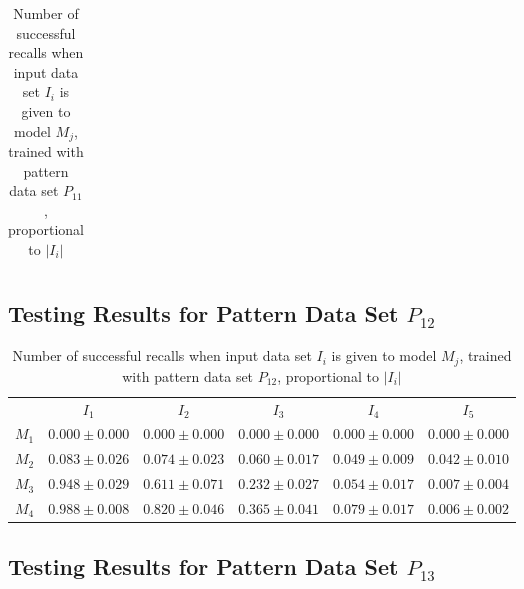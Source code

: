 \documentclass[12pt]{article}
\begin{document}
\begin{appendices}
\begin{table}[H]
\begin{tabular}{cccccc}
    \end{tabular}
    \caption{Number of successful recalls when input data set $I_i$ is given to model $M_j$, trained with pattern data set $P_{11}$, proportional to $\left|I_i\right|$}
    \end{table}
    
\subsection{Testing Results for Pattern Data Set $P_{12}$}


    \begin{table}[H]
    \centering
    \def\arraystretch{1.5}
    \footnotesize
    \begin{tabular}{cccccc}
    
 & $I_{1}$  & $I_{2}$  & $I_{3}$  & $I_{4}$  & $I_{5}$ \\ \cline{2-6}
$M_{1}$  & $0.000\pm0.000$  & $0.000\pm0.000$  & $0.000\pm0.000$  & $0.000\pm0.000$  & $0.000\pm0.000$ \\
$M_{2}$  & $0.083\pm0.026$  & $0.074\pm0.023$  & $0.060\pm0.017$  & $0.049\pm0.009$  & $0.042\pm0.010$ \\
$M_{3}$  & $0.948\pm0.029$  & $0.611\pm0.071$  & $0.232\pm0.027$  & $0.054\pm0.017$  & $0.007\pm0.004$ \\
$M_{4}$  & $0.988\pm0.008$  & $0.820\pm0.046$  & $0.365\pm0.041$  & $0.079\pm0.017$  & $0.006\pm0.002$ \\

    \end{tabular}
    \caption{Number of successful recalls when input data set $I_i$ is given to model $M_j$, trained with pattern data set $P_{12}$, proportional to $\left|I_i\right|$}
    \end{table}
    
\subsection{Testing Results for Pattern Data Set $P_{13}$}


    \begin{table}[H]
    \centering
    \def\arraystretch{1.5}
    \footnotesize
    \begin{tabular}{cccccc}
    

\end{tabular}
\end{table}
\end{appendices}
\end{document}
